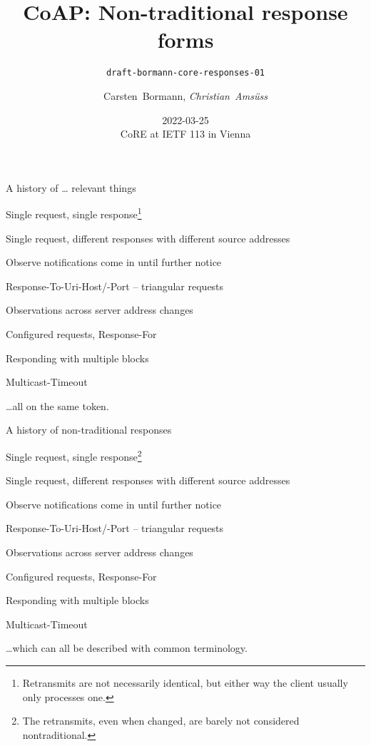 \documentclass[aspectratio=169]{beamer}
\title{CoAP: Non-traditional response forms}
\subtitle{\texttt{draft-bormann-core-responses-01}}
\author{Carsten~Bormann, \textit{Christian~Amsüss}}
\date{2022-03-25 \\CoRE at IETF 113 in Vienna}
\begin{document}
\frame{\titlepage}


\newcommand{\otheritems}{
\item[RFC7252 multicast] Single request, different responses with different source addresses

\item[RFC7641] Observe notifications come in until further notice

\item[core-coap-sms] Response-To-Uri-Host/-Port -- triangular requests

\item[core-coap-endpoint-id] Observations across server address changes

\item[core-responses-00] Configured requests, Response-For

\item[RFC9177] Responding with multiple blocks

\item[core-groupcomm-proxy] Multicast-Timeout
}

\begin{frame}{A history of \ldots{} relevant things}\large
	\begin{description}
		\item[RFC7252 simplest case] Single request, single response\footnote{Retransmits are not necessarily identical, but either way the client usually only processes one.}

		\otheritems
	\end{description}

	\raggedleft

	\ldots all on the same token.
\end{frame}

\begin{frame}{A history of non-traditional responses}\large
	\begin{description}[RFC7252 simplest case]
		\item[\color{gray}RFC7252 simplest case] \color{gray} Single request, single response\footnote{The retransmits, even when changed, are barely not considered nontraditional.}\color{black}

		\otheritems
	\end{description}

	\raggedleft

	\ldots which can all be described with common terminology.
\end{frame}
\end{document}
